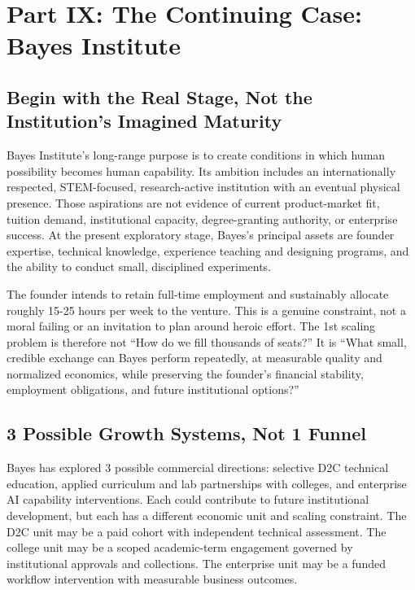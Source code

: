 \section*{Part IX: The Continuing Case: Bayes Institute}
\label{sec:part9_bayes_institute_scaling}

\subsection{Begin with the Real Stage, Not the Institution's Imagined Maturity}
\label{sec:bayes_real_stage}

Bayes Institute's long-range purpose is to create conditions in which human possibility becomes human capability. Its ambition includes an internationally respected, STEM-focused, research-active institution with an eventual physical presence. Those aspirations are not evidence of current product-market fit, tuition demand, institutional capacity, degree-granting authority, or enterprise success. At the present exploratory stage, Bayes's principal assets are founder expertise, technical knowledge, experience teaching and designing programs, and the ability to conduct small, disciplined experiments.

The founder intends to retain full-time employment and sustainably allocate roughly 15-25 hours per week to the venture. This is a genuine constraint, not a moral failing or an invitation to plan around heroic effort. The 1st scaling problem is therefore not ``How do we fill thousands of seats?'' It is ``What small, credible exchange can Bayes perform repeatedly, at measurable quality and normalized economics, while preserving the founder's financial stability, employment obligations, and future institutional options?''

\subsection{3 Possible Growth Systems, Not 1 Funnel}
\label{sec:three_possible_growth_systems}

Bayes has explored 3 possible commercial directions: selective D2C technical education, applied curriculum and lab partnerships with colleges, and enterprise AI capability interventions. Each could contribute to future institutional development, but each has a different economic unit and scaling constraint. The D2C unit may be a paid cohort with independent technical assessment. The college unit may be a scoped academic-term engagement governed by institutional approvals and collections. The enterprise unit may be a funded workflow intervention with measurable business outcomes.

